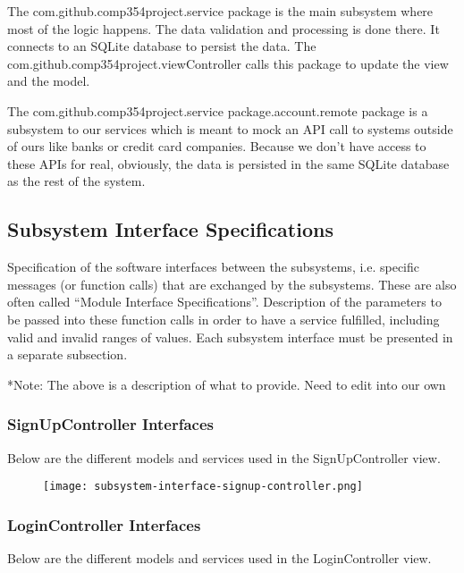 \documentclass[12pt]{article}
\begin{document}
The com.github.comp354project.service package is the main subsystem where most of the logic happens. The data validation and processing is done there. It connects to an SQLite database to persist the data. The com.github.comp354project.viewController calls this package to update the view and the model.

The com.github.comp354project.service package.account.remote package is a subsystem to our services which is meant to mock an API call to systems outside of ours like banks or credit card companies. Because we don't have access to these APIs for real, obviously, the data is persisted in the same SQLite database as the rest of the system.

\subsection{Subsystem Interface Specifications} \label{subsystem interface}

Specification of the software interfaces between the subsystems,
i.e. specific messages (or function calls) that are exchanged by the subsystems.
These are also often called ``Module Interface Specifications''.
Description of the parameters to be passed into these function calls in order to have a service fulfilled,
including valid and invalid ranges of values.
Each subsystem interface must be presented in a separate subsection.

*Note: The above is a description of what to provide. Need to edit into our own

\subsubsection{SignUpController Interfaces}

Below are the different models and services used in the SignUpController view.

\begin{figure}[H]
\texttt{[image: subsystem-interface-signup-controller.png]}
\end{figure}

\clearpage

\subsubsection{LoginController Interfaces}

Below are the different models and services used in the LoginController view.
\end{document}
